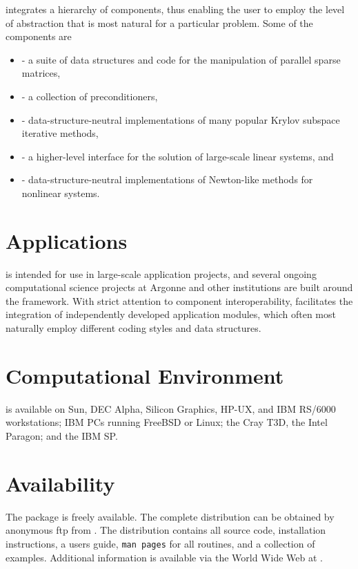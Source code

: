  integrates a hierarchy of components, thus
enabling the user to employ the level of abstraction that is most
natural for a particular problem.  Some of the components are
\vspace{-.4cm}
\begin{itemize}
\item {} - a suite of data structures and code
      for the manipulation of parallel sparse matrices,
\vsp
\item {} - a collection of preconditioners,
\vsp
\item {} - data-structure-neutral implementations of
      many popular Krylov subspace iterative methods,
\vsp
\item {} - a higher-level interface for the solution of
      large-scale linear systems, and
\vsp
\item {} - data-structure-neutral implementations of Newton-like
      methods for nonlinear systems.
\end{itemize}
\vsp

\section*{Applications}
 is intended for use in large-scale application projects, and
several ongoing computational science projects at Argonne
and other institutions are built around the  framework.
With strict attention to component interoperability, 
facilitates the integration of independently developed application
modules, which often most naturally employ different coding styles and
data structures. 

\section*{Computational Environment}
 is available on Sun, DEC Alpha, Silicon Graphics, HP-UX, and IBM
RS/6000 workstations; IBM PCs running FreeBSD or Linux; the Cray T3D,
the Intel Paragon; and the IBM SP.

\section*{Availability}

The  package is freely available.
The complete distribution can be obtained by anonymous ftp from 
.
The  distribution contains all source code, installation
instructions, a users guide, {\tt man pages} for all routines, and a
collection of examples.  Additional information is available via the
World Wide Web at
.

\vspace{-.1cm}
\makeinfo

